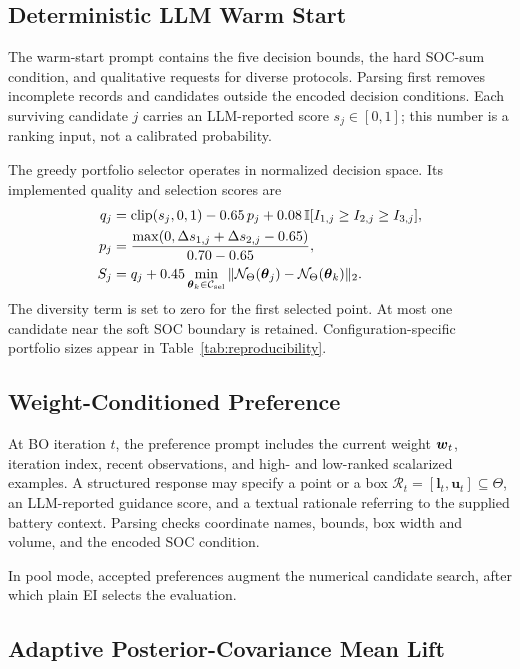 \subsection{Deterministic LLM Warm Start}
\label{sec:warmstart}

The warm-start prompt contains the five decision bounds, the hard SOC-sum
condition, and qualitative requests for diverse protocols. Parsing first
removes incomplete records and candidates outside the encoded decision
conditions. Each surviving candidate $j$ carries an LLM-reported score
$s_j\in[0,1]$; this number is a ranking input, not a calibrated probability.

The greedy portfolio selector operates in normalized decision space. Its
implemented quality and selection scores are
\begin{align}
q_j&=\operatorname{clip}(s_j,0,1)-0.65\,p_j
+0.08\,\mathbb I[I_{1,j}\geq I_{2,j}\geq I_{3,j}],\nonumber\\
p_j&=\frac{\max(0,\Delta s_{1,j}+\Delta s_{2,j}-0.65)}
{0.70-0.65},\nonumber\\
S_j&=q_j+0.45\min_{\boldsymbol{\theta}_k\in\mathcal{C}_{\mathrm{sel}}}
\|\mathcal N_\Theta(\boldsymbol{\theta}_j)-\mathcal N_\Theta(\boldsymbol{\theta}_k)\|_2 .
\label{eq:portfolio}
\end{align}
The diversity term is set to zero for the first selected point. At most one
candidate near the soft SOC boundary is retained. Configuration-specific
portfolio sizes appear in Table~\ref{tab:reproducibility}.

\subsection{Weight-Conditioned Preference}
\label{sec:guidance}

At BO iteration $t$, the preference prompt includes the current weight
$\boldsymbol{w}_t$, iteration index, recent observations, and high- and low-ranked
scalarized examples. A structured response may specify a point or a box
$\mathcal R_t=[\mathbf l_t,\mathbf u_t]\subseteq\Theta$, an LLM-reported
guidance score, and a textual rationale referring to the supplied battery
context. Parsing checks coordinate names, bounds, box width and volume, and the
encoded SOC condition.

In pool mode, accepted preferences augment the numerical candidate search,
after which plain EI selects the evaluation.

\subsection{Adaptive Posterior-Covariance Mean Lift}
\label{sec:coupling}

